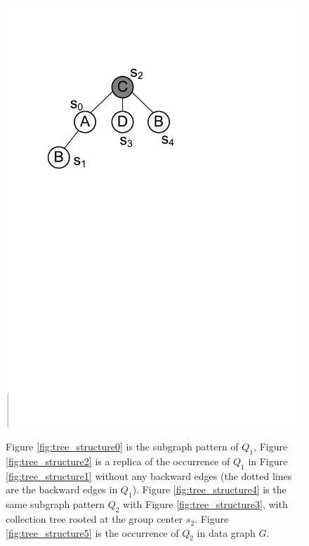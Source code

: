 \begin{figure}[t!]
{		\includegraphics[scale=0.33]{images/tree_structure4}
		\label{fig:tree_structure4}
	}
	\vspace{-2mm}
	\caption{\scriptsize Figure \ref{fig:tree_structure0} is the subgraph pattern of $Q_1$, Figure \ref{fig:tree_structure2} is a replica of the occurrence of $Q_1$ in Figure \ref{fig:tree_structure1} without any backward edges (the dotted lines are the backward edges in $Q_1$). Figure \ref{fig:tree_structure4} is the same subgraph pattern $Q_2$ with Figure \ref{fig:tree_structure3}, with collection tree rooted at the group center $s_2$. Figure \ref{fig:tree_structure5} is the occurrence of $Q_2$ in data graph $G$.}
	\label{fig:replica}
	\vspace{-6mm}
\end{figure}
